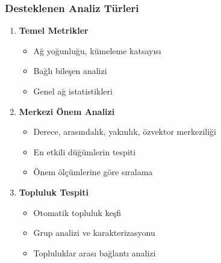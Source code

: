 \documentclass[aspectratio=169]{beamer}
\begin{document}
\begin{frame}
\frametitle{Desteklenen Analiz Türleri}
\begin{enumerate}
    \item \textbf{Temel Metrikler}
    \begin{itemize}
        \item Ağ yoğunluğu, kümeleme katsayısı
        \item Bağlı bileşen analizi
        \item Genel ağ istatistikleri
    \end{itemize}
    
    \item \textbf{Merkezi Önem Analizi}
    \begin{itemize}
        \item Derece, arasındalık, yakınlık, özvektor merkeziliği
        \item En etkili düğümlerin tespiti
        \item Önem ölçümlerine göre sıralama
    \end{itemize}
    
    \item \textbf{Topluluk Tespiti}
    \begin{itemize}
        \item Otomatik topluluk keşfi
        \item Grup analizi ve karakterizasyonu
        \item Topluluklar arası bağlantı analizi
    \end{itemize}
\end{enumerate}
\end{frame}
\end{document}

